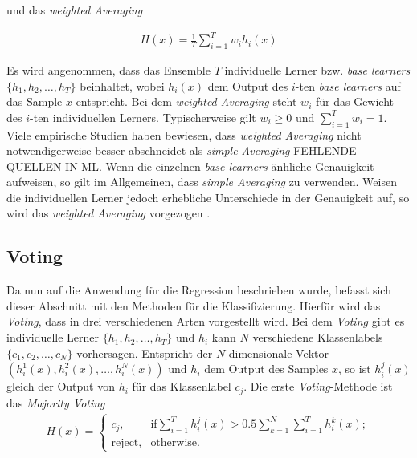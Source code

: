 und das \textit{weighted Averaging}

\begin{equation}
    \begin{gathered}
        H(x) = \frac{1}{T}\sum_{i=1}^{T}w_{i}h_{i}(x)
    \end{gathered}
    \label{eq:weightedAveraging}
\end{equation}

Es wird angenommen, dass das Ensemble $T$ individuelle Lerner bzw. \textit{base learners} $\{h_1, h_2,\dots,h_T\}$ beinhaltet, wobei $h_{i}(x)$ dem Output des $i$-ten \textit{base learners} auf das Sample $x$ entspricht. Bei dem \textit{weighted Averaging} steht $w_i$ für das Gewicht des $i$-ten individuellen Lerners. Typischerweise gilt $w_i \geqslant 0$ und $\sum_{i=1}^{T}w_i = 1$. Viele empirische Studien haben bewiesen, dass \textit{weighted Averaging} nicht notwendigerweise besser abschneidet als \textit{simple Averaging} FEHLENDE QUELLEN IN ML. Wenn die einzelnen \textit{base learners} änhliche Genauigkeit aufweisen, so gilt im Allgemeinen, dass \textit{simple Averaging} zu verwenden. Weisen die individuellen Lerner jedoch erhebliche Unterschiede in der Genauigkeit auf, so wird das \textit{weighted Averaging} vorgezogen \autocite[vgl. S.195]{Zhou.2021}.

\subsection{Voting}
Da nun auf die Anwendung für die Regression beschrieben wurde, befasst sich dieser Abschnitt mit den Methoden für die Klassifizierung. Hierfür wird das \textit{Voting}, dass in drei verschiedenen Arten vorgestellt wird. Bei dem \textit{Voting} gibt es individuelle Lerner $\{h_1, h_2,\dots,h_T\}$ und $h_i$ kann $N$ verschiedene Klassenlabels $\{c_1, c_2,\dots, c_N\}$ vorhersagen. Entspricht der $N$-dimensionale Vektor $(h_{i}^{1}(x), h_{i}^{2}(x),\dots, h_{i}^{N}(x))$ und $h_i$ dem Output des Samples $x$, so ist $h_{i}^{j}(x)$ gleich der Output von $h_i$ für das Klassenlabel $c_j$. Die erste \textit{Voting}-Methode ist das \textit{Majority Voting}
\begin{equation}
    \begin{gathered}
        H(x) = \begin{cases}
            \text{$c_j$,} & \text{if} \sum_{i=1}^{T}h_{i}^{j}(x) > 0.5 \sum_{k=1}^{N}\sum_{i=1}^{T}h_{i}^{k}(x); \\
           \text{reject,} & \text{otherwise.}
        \end{cases}
    \end{gathered}
    \label{eq:majorityVoting}
\end{equation}

